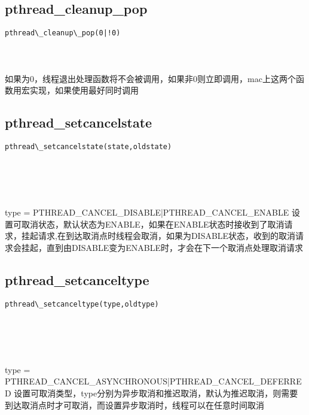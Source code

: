 \documentclass[10pt,a4paper]{article}
\begin{document}
\subsection{pthread\_cleanup\_pop}
\begin{spacing}{2.0}
\lstset{language=C,numbers=none}
\begin{lstlisting}
pthread\_cleanup\_pop(0|!0)
\end{lstlisting}
{\large\color[rgb]{0.2,0.4,0.6}{0|!0:}}
\paragraph{ \ \ }如果为0，线程退出处理函数将不会被调用，如果非0则立即调用，mac上这两个函数用宏实现，如果使用最好同时调用
\end{spacing}

\subsection{pthread\_setcancelstate}
\begin{spacing}{2.0}
\lstset{language=C,numbers=none}
\begin{lstlisting}
pthread\_setcancelstate(state,oldstate)
\end{lstlisting}
{\large\color[rgb]{0.2,0.4,0.6}{state:}} \\
{\large\color[rgb]{0.2,0.4,0.6}{oldstate:}}
\paragraph{ \ \ }type = PTHREAD\_CANCEL\_DISABLE|PTHREAD\_CANCEL\_ENABLE 设置可取消状态，默认状态为ENABLE，如果在ENABLE状态时接收到了取消请求，挂起请求,在到达取消点时线程会取消，如果为DISABLE状态，收到的取消请求会挂起，直到由DISABLE变为ENABLE时，才会在下一个取消点处理取消请求
\end{spacing}

\subsection{pthread\_setcanceltype}
\begin{spacing}{2.0}
\lstset{language=C,numbers=none}
\begin{lstlisting}
pthread\_setcanceltype(type,oldtype)
\end{lstlisting}
{\large\color[rgb]{0.2,0.4,0.6}{type:}} \\
{\large\color[rgb]{0.2,0.4,0.6}{oldtype:}}
\paragraph{ \ \ }type = PTHREAD\_CANCEL\_ASYNCHRONOUS|PTHREAD\_CANCEL\_DEFERRED 设置可取消类型，type分别为异步取消和推迟取消，默认为推迟取消，则需要到达取消点时才可取消，而设置异步取消时，线程可以在任意时间取消
\end{spacing}
\end{document}
